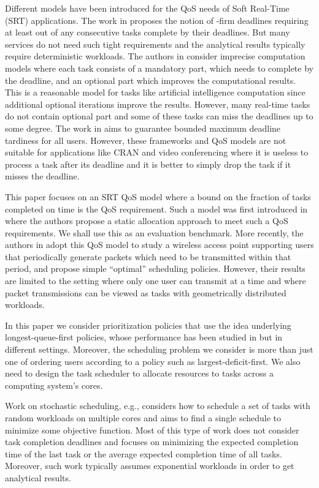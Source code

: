 \documentclass[prodmode,acmtompecs]{acmsmall}
\newcommand{\add}[1]{#1}
\begin{document}
Different models have been introduced for the QoS needs of Soft Real-Time (SRT) applications. 
The work in \cite{HaR95,BeB97,Ram99} proposes the notion of -firm deadlines requiring at least  out of any  consecutive tasks complete by their deadlines. 
But many services do not need such tight requirements and \add{the analytical results typically require deterministic workloads}. 
The authors in \cite{LLN87,HoK13b} consider imprecise computation models where each task consists of a mandatory part, which needs to complete by the deadline, and an optional part which improves the computational results. This is a reasonable model for tasks like artificial intelligence computation since additional optional iterations improve the results. However, many real-time tasks do not contain optional part and some of these tasks can miss the deadlines up to some degree. 
The work in \cite{LiA09} aims to guarantee bounded maximum deadline tardiness for all users. 
However, these frameworks and QoS models are not suitable for applications like CRAN and video conferencing where it is useless to process a task after its deadline and it is better to simply drop the task if it misses the deadline. 

This paper focuses on an SRT QoS model where a bound on the fraction of tasks completed on time is the QoS requirement. 
Such a model was first introduced in \cite{AtB98} where the authors propose a static allocation approach to meet such a QoS requirements. We shall use this as an evaluation benchmark. 
More recently, the authors in \cite{HoK13b,HoK12} adopt this QoS model to study a wireless access point supporting users that periodically generate packets which need to be transmitted within that period, and propose simple ``optimal'' scheduling policies. However, their results are limited to the setting where only one user can transmit at a time and where packet transmissions can be viewed as tasks with geometrically distributed workloads. 


In this paper we consider prioritization policies that use the idea underlying longest-queue-first policies, whose performance has been studied in \cite{DiW06,JLS07,KWJ13} but in different settings. Moreover, the scheduling problem we consider is more than just one of ordering users according to a policy such as largest-deficit-first. We also need to design the task scheduler to allocate resources to tasks across a computing system's cores. 

Work on stochastic scheduling, e.g., \cite{BCS74,LLK93,Pin12b,AGG10,BDW86,AlS03} considers how to schedule a set of tasks with random workloads on multiple cores and aims to find a single schedule to minimize some objective function. Most of this type of work does not consider task completion deadlines and focuses on minimizing the expected completion time of the last task or the average expected completion time of all tasks. Moreover, such work typically assumes exponential workloads in order to get analytical results.  
\end{document}
